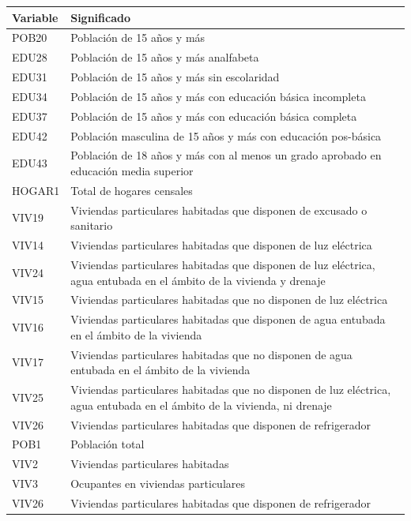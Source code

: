 \documentclass[paper=letter, fontsize=11pt]{scrartcl}
\numberwithin{equation}{section} %
\numberwithin{figure}{section} %
\numberwithin{table}{section} %
\begin{document}
\begin{enumerate}
\begin{enumerate}
\begin{table}[H]
\centering
\begin{tabular}{ll}
  \hline
Variable   	&	 Significado  	\\
     \hline
POB20    	&	     Población de 15 años y más 	\\
EDU28  	&	 Población de 15 años y más analfabeta    	\\
EDU31 	&	 Población de 15 años y más sin escolaridad 	\\
EDU34 	&	 Población de 15 años y más con educación básica incompleta 	\\
EDU37 	&	 Población de 15 años y más con educación básica completa    	\\
EDU42 	&	 Población masculina de 15 años y más con educación pos-básica 	\\
EDU43 	&	 Población de 18 años y más con al menos un grado aprobado en educación media superior    	\\
HOGAR1 	&	 Total de hogares censales    	\\
VIV19 	&	 Viviendas particulares habitadas que disponen de excusado o sanitario    	\\
VIV14 	&	 Viviendas particulares habitadas que disponen de luz eléctrica 	\\
VIV24 	&	 Viviendas particulares habitadas que disponen de luz eléctrica, agua entubada en el ámbito de la vivienda y drenaje 	\\
VIV15    	&	     Viviendas particulares habitadas que no disponen de luz eléctrica    	\\
VIV16    	&	     Viviendas particulares habitadas que disponen de agua entubada en el ámbito de la vivienda        	\\
VIV17    	&	     Viviendas particulares habitadas que no disponen de agua entubada en el ámbito de la vivienda      	\\
VIV25    	&	      Viviendas particulares habitadas que no disponen de luz eléctrica, agua entubada en el ámbito de la vivienda, ni drenaje    	\\
VIV26    	&	     Viviendas particulares habitadas que disponen de refrigerador    	\\
POB1    	&	      Población total    	\\
VIV2    	&	      Viviendas particulares habitadas     	\\
VIV3    	&	      Ocupantes en viviendas particulares    	\\
VIV26    	&	     Viviendas particulares habitadas que disponen de refrigerador            	\\

\end{tabular}
\end{table}
\end{enumerate}
\end{enumerate}
\end{document}
